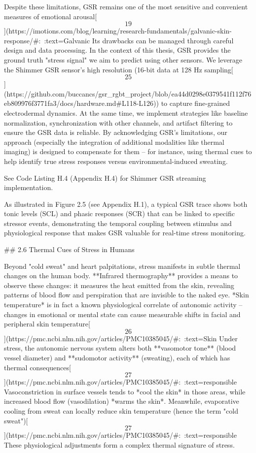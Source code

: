 \documentclass[12pt,a4paper]{article}
\begin{document}
Despite these limitations, GSR remains one of the most sensitive and
convenient measures of emotional
arousal[\[19\]](https://imotions.com/blog/learning/research-fundamentals/galvanic-skin-response/#:~:text=Galvanic%
Its drawbacks can be managed through careful design and data processing.
In the context of this thesis, GSR provides the ground truth "stress
signal" we aim to predict using other sensors. We leverage the Shimmer
GSR sensor's high resolution (16-bit data at 128 Hz
sampling[\[25\]](https://github.com/buccancs/gsr_rgbt_project/blob/ea44d0298e0379541f112f76eb809976f3771fa3/docs/hardware.md#L118-L126))
to capture fine-grained electrodermal dynamics. At the same time, we
implement strategies like baseline normalization, synchronization with
other channels, and artifact filtering to ensure the GSR data is
reliable. By acknowledging GSR's limitations, our approach (especially
the integration of additional modalities like thermal imaging) is
designed to compensate for them -- for instance, using thermal cues to
help identify true stress responses versus environmental-induced
sweating.

See Code Listing H.4 (Appendix H.4) for Shimmer GSR streaming implementation.

As illustrated in Figure 2.5 (see Appendix H.1), a typical GSR trace shows both tonic levels (SCL) and phasic responses (SCR) that can be linked to specific stressor events, demonstrating the temporal coupling between stimulus and physiological response that makes GSR valuable for real-time stress monitoring.

## 2.6 Thermal Cues of Stress in Humans

Beyond "cold sweat" and heart palpitations, stress manifests in subtle
thermal changes on the human body. **Infrared thermography** provides a
means to observe these changes: it measures the heat emitted from the
skin, revealing patterns of blood flow and perspiration that are
invisible to the naked eye. *Skin temperature* is in fact a known
physiological correlate of autonomic activity -- changes in emotional or
mental state can cause measurable shifts in facial and peripheral skin
temperature[\[26\]](https://pmc.ncbi.nlm.nih.gov/articles/PMC10385045/#:~:text=Skin%
Under stress, the autonomic nervous system alters both **vasomotor
tone** (blood vessel diameter) and **sudomotor activity** (sweating),
each of which has thermal
consequences[\[27\]](https://pmc.ncbi.nlm.nih.gov/articles/PMC10385045/#:~:text=responsible%
Vasoconstriction in surface vessels tends to *cool the skin* in those
areas, while increased blood flow (vasodilation) *warms the skin*.
Meanwhile, evaporative cooling from sweat can locally reduce skin
temperature (hence the term "cold
sweat")[\[27\]](https://pmc.ncbi.nlm.nih.gov/articles/PMC10385045/#:~:text=responsible%
These physiological adjustments form a complex thermal signature of
stress.
\end{document}
